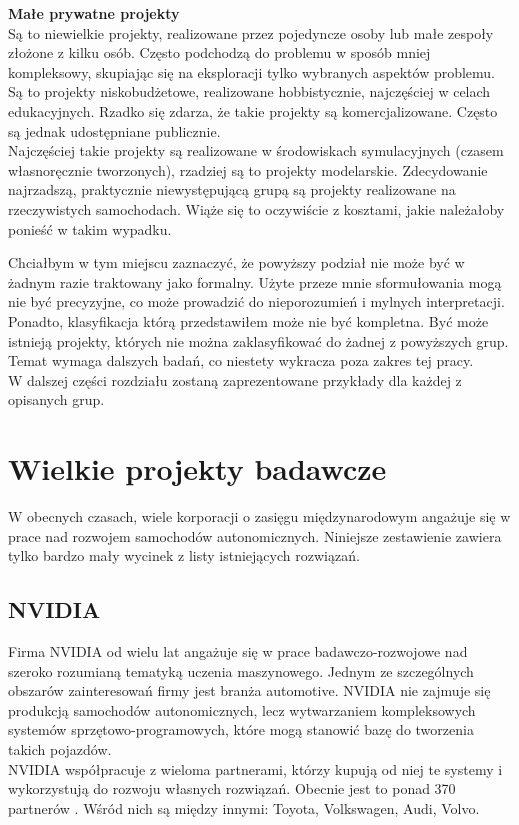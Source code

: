 \begin{enumerate*}
\item \textbf{Małe prywatne projekty} \\
Są to niewielkie projekty, realizowane przez pojedyncze osoby lub małe zespoły złożone z kilku osób. Często podchodzą do problemu w sposób mniej kompleksowy, skupiając się na eksploracji tylko wybranych aspektów problemu. Są to projekty niskobudżetowe, realizowane hobbistycznie, najczęściej w celach edukacyjnych. Rzadko się zdarza, że takie projekty są komercjalizowane. Często są jednak udostępniane publicznie. \\
Najczęściej takie projekty są realizowane w środowiskach symulacyjnych (czasem własnoręcznie tworzonych), rzadziej są to projekty modelarskie. Zdecydowanie najrzadszą, praktycznie niewystępującą grupą są projekty realizowane na rzeczywistych samochodach. Wiąże się to oczywiście z kosztami, jakie należałoby ponieść w takim wypadku.

\end{enumerate*}

Chciałbym w tym miejscu zaznaczyć, że powyższy podział nie może być w żadnym razie traktowany jako formalny. 
Użyte przeze mnie sformułowania mogą nie być precyzyjne, co może prowadzić do nieporozumień i mylnych interpretacji.
Ponadto, klasyfikacja którą przedstawiłem może nie być kompletna. Być może istnieją projekty, których nie można zaklasyfikować do żadnej z powyższych grup. Temat wymaga dalszych badań, co niestety wykracza poza zakres tej pracy. \\
W dalszej części rozdziału zostaną zaprezentowane przykłady dla każdej z opisanych grup. 

\section{Wielkie projekty badawcze}
W obecnych czasach, wiele korporacji o zasięgu międzynarodowym angażuje się w prace nad rozwojem samochodów autonomicznych. 
Niniejsze zestawienie zawiera tylko bardzo mały wycinek z listy istniejących rozwiązań.

\subsection{NVIDIA}
Firma NVIDIA od wielu lat angażuje się w prace badawczo-rozwojowe nad szeroko rozumianą tematyką uczenia maszynowego. Jednym ze szczególnych obszarów zainteresowań firmy jest branża automotive.
NVIDIA nie zajmuje się produkcją samochodów autonomicznych, lecz wytwarzaniem kompleksowych systemów sprzętowo-programowych, które mogą stanowić bazę do tworzenia takich pojazdów. \\
NVIDIA współpracuje z wieloma partnerami, którzy kupują od niej te systemy i wykorzystują do rozwoju własnych rozwiązań. Obecnie jest to ponad 370 partnerów \cite{nvidia:partners}. Wśród nich są między innymi: Toyota, Volkswagen, Audi, Volvo.

